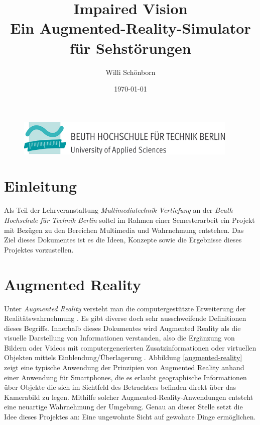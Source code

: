 \documentclass[a4paper]{article}
\title{Impaired Vision \\ Ein Augmented-Reality-Simulator für Sehstörungen}
\author{Willi Schönborn}
\date{\today}
\begin{document}
\begin{figure}[H]
\centering
\includegraphics{beuth.png}
\maketitle
\end{figure}

\section*{Einleitung}
Als Teil der Lehrveranstaltung \textit{Multimediatechnik Vertiefung} an der \textit{Beuth Hochschule für Technik Berlin} soltel im Rahmen einer Semesterarbeit ein Projekt mit Bezügen zu den Bereichen Multimedia und Wahrnehmung entstehen. Das Ziel dieses Dokumentes ist es die Ideen, Konzepte sowie die Ergebnisse dieses Projektes vorzustellen.

\section*{Augmented Reality}
Unter \textit{Augmented Reality} versteht man die computergestützte Erweiterung der Realitätswahrnehmung \cite{WP-AR2011}. Es gibt diverse doch sehr ausschweifende Definitionen dieses Begriffs. Innerhalb dieses Dokumentes wird Augmented Reality als die visuelle Darstellung von Informationen verstanden, also die Ergänzung von Bildern oder Videos mit computergenerierten Zusatzinformationen oder virtuellen Objekten mittels Einblendung/Überlagerung \cite{WP-AR2011}. Abbildung \ref{augmented-reality} zeigt eine typische Anwendung der Prinzipien von Augmented Reality anhand einer Anwendung für Smartphones, die es erlaubt geographische Informationen über Objekte die sich im Sichtfeld des Betrachters befinden direkt über das Kamerabild zu legen. Mithilfe solcher Augmented-Reality-Anwendungen entsteht eine neuartige Wahrnehmung der Umgebung. Genau an dieser Stelle setzt die Idee dieses Projektes an: Eine ungewohnte Sicht auf gewohnte Dinge ermöglichen.
\end{document}
